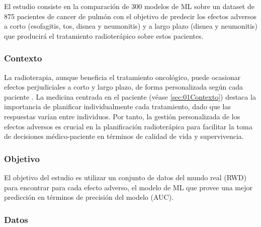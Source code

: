 El estudio consiste en la comparación de 300 modelos de ML sobre un dataset de 875 pacientes de cancer de pulmón con el objetivo de predecir los efectos adversos a corto (esofagitis, tos, disnea y neumonitis) y a largo plazo (disnea y neumonitis) que producirá el tratamiento radioterápico sobre estos pacientes. 

\subsubsection{Contexto}


La radioterapia, aunque beneficia el tratamiento oncológico, puede ocasionar efectos perjudiciales a corto y largo plazo, de forma personalizada según cada paciente \cite{nunez2019comparison, nunez2023benchmarking}. La medicina centrada en el paciente (véase \ref{sec:01Contexto}) destaca la importancia de planificar individualmente cada tratamiento, dado que las respuestas varían entre individuos. Por tanto, la gestión personalizada de los efectos adversos es crucial en la planificación radioterápica para facilitar la toma de decisiones médico-paciente en términos de calidad de vida y supervivencia.

\subsubsection{Objetivo}

El objetivo del estudio es utilizar un conjunto de datos del mundo real (RWD) para encontrar para cada efecto adverso, el modelo de ML que provee una mejor predicción en términos de precisión del modelo (AUC).

\subsubsection{Datos}

